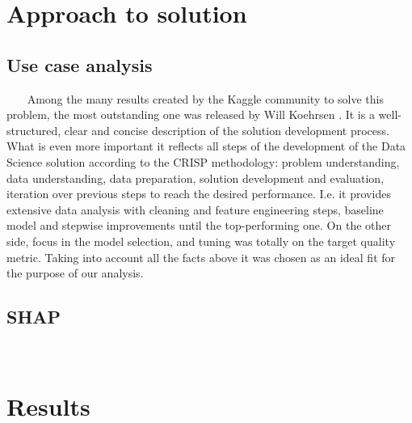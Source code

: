 \section{Approach to solution}
\subsection{Use case analysis}~~~
    Among the many results created by the Kaggle community to solve this problem, the most outstanding one was released by Will Koehrsen \cite{kaggle_2}. It is a well-structured, clear and concise description of the solution development process. What is even more important it reflects all steps of the development of the Data Science solution according to the CRISP methodology: problem understanding, data understanding, data preparation, solution development and evaluation, iteration over previous steps to reach the desired performance. I.e. it provides extensive data analysis with cleaning and feature engineering steps, baseline model and stepwise improvements until the top-performing one. On the other side, focus in the model selection, and tuning was totally on the target quality metric. Taking into account all the facts above it was chosen as an ideal fit for the purpose of our analysis.
    
\subsection{SHAP}~~~
    \cite{NIPS2017_7062}
\section{Results}~~~

